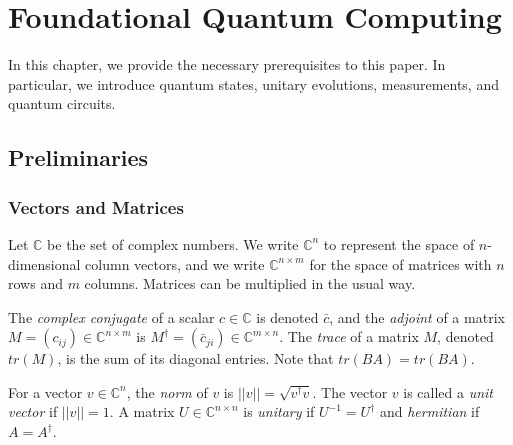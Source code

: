 \documentclass[12pt]{dalthesis}
\begin{document}
\chapter{Foundational Quantum Computing}
\label{foundations}

In this chapter, we provide the necessary prerequisites to this paper. In particular, we introduce quantum states, unitary evolutions, measurements, and quantum circuits.
\section{Preliminaries}
\subsection{Vectors and Matrices}
Let $\mathbb{C}$ be the set of complex numbers. We write $\mathbb{C}^n$ to represent the space of $n$-dimensional column vectors, and we write $\mathbb{C}^{n \times m}$ for the space of matrices with $n$ rows and $m$ columns. Matrices can be multiplied in the usual way. 

The \emph{complex conjugate} of a scalar $c \in \mathbb{C}$ is denoted $\bar{c}$, and the \emph{adjoint} of a matrix $M = (c_{ij}) \in \mathbb{C}^{n \times m}$ is $M^\dag = (\bar{c}_{ji}) \in \mathbb{C}^{m \times n}$. The \emph{trace} of a matrix $M$, denoted $tr(M)$, is the sum of its diagonal entries. Note that $tr(BA) = tr(BA)$. 

For a vector $v \in \mathbb{C}^n$, the \textit{norm} of $v$ is $||v|| = \sqrt{v^\dag v}$. The vector $v$ is called a \textit{unit vector} if $||v|| = 1$. A matrix $U \in \mathbb{C}^{n \times n}$ is \emph{unitary} if $U^{-1} = U^\dag$ and \emph{hermitian} if  $A = A^\dag$.
\end{document}
